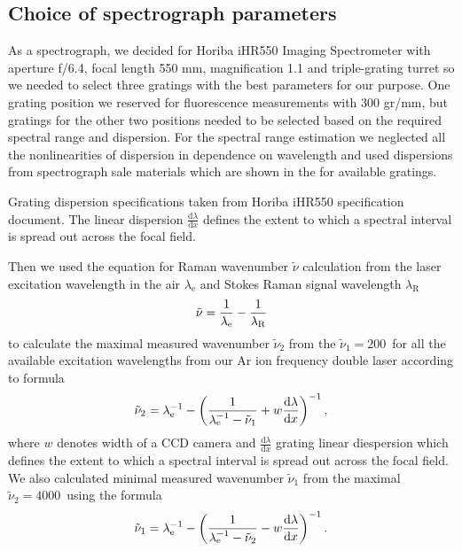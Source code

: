 \subsection{Choice of spectrograph parameters}

As a spectrograph, we decided for Horiba iHR550 Imaging Spectrometer with
aperture
f/6.4, focal length 550 mm, magnification 1.1 and triple-grating turret so we
needed to select three gratings with the best parameters for our purpose. One
grating position we reserved for fluorescence measurements with 300 gr/mm, but
gratings for the other two positions needed to be selected based on the
required spectral range and dispersion. For the spectral range estimation
we neglected all the nonlinearities of dispersion in dependence on wavelength
and used dispersions from spectrograph sale materials which are shown in the
for available gratings.

\begin{table}
	\centering
	
	\caption{Grating dispersion specifications taken from Horiba iHR550
		specification document. The linear dispersion
		$\frac{\text{d}\lambda}{\text{d}x}$ defines the extent to which a spectral
		interval is spread out across the focal field.}
	\label{\tablabel{spectrograph_selection:dispersion_spec}}
\end{table}

Then we used the equation for Raman wavenumber $\tilde{\nu}$ calculation from
the laser excitation wavelength in the air $\lambda_\text{e}$ and Stokes Raman
signal wavelength $\lambda_\text{R}$
\begin{equation}
	\tilde{\nu} = \frac{1}{\lambda_\text{e}} - \frac{1}{\lambda_\text{R}}
	\label{\eqnlabel{spectrograph_selection:nu}}
\end{equation}
to calculate the maximal measured wavenumber $\tilde{\nu}_2$ from the
$\tilde{\nu}_1 = 200$\,\icm{} for all the available excitation wavelengths
from our Ar ion frequency double laser according to formula
\begin{equation}
	\tilde{\nu}_2 = \lambda_\text{e}^{-1}
		- \left(\frac{1}{\lambda_\text{e}^{-1} - \tilde{\nu}_1}
			+ w\frac{\text{d}\lambda}{\text{d}x}\right)^{-1},
	\label{\eqnlabel{spectrograph_selection:spectral_range_max_est}}
\end{equation}
where $w$ denotes width of a CCD camera and $\frac{\text{d}\lambda}{\text{d}x}$
grating linear diespersion which defines the extent to which a spectral
interval is spread out across the focal field. We also calculated minimal
measured wavenumber $\tilde{\nu}_1$ from the maximal
$\tilde{\nu}_2 = 4000$\,\icm{} using the formula
\begin{equation}
	\tilde{\nu}_1 = \lambda_\text{e}^{-1}
		- \left(\frac{1}{\lambda_\text{e}^{-1} - \tilde{\nu}_2}
			- w\frac{\text{d}\lambda}{\text{d}x}\right)^{-1}.
	\label{\eqnlabel{spectrograph_selection:spectral_range_min_est}}
\end{equation}

